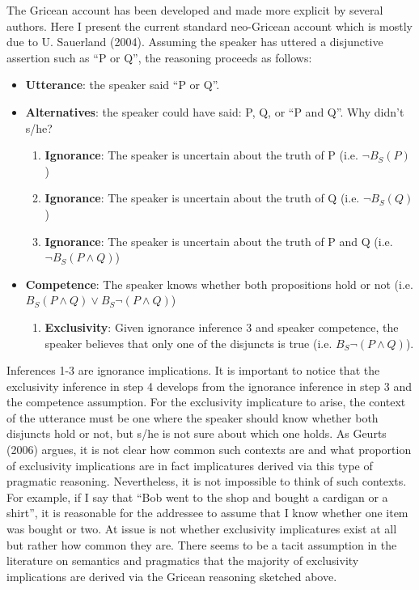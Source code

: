 \documentclass[oneside]{report}
\theoremstyle{definition}
\theoremstyle{definition}
\theoremstyle{definition}
\theoremstyle{remark}
\begin{document}
The Gricean account has been developed and made more explicit by several
authors. Here I present the current standard neo-Gricean account which
is mostly due to U. Sauerland (2004). Assuming the speaker has uttered a
disjunctive assertion such as ``P or Q'', the reasoning proceeds as
follows:
\begin{itemize}
\tightlist
\item
  \textbf{Utterance}: the speaker said ``P or Q''.
\item
  \textbf{Alternatives}: the speaker could have said: P, Q, or ``P and
  Q''. Why didn't s/he?
  \begin{enumerate}
  \def\labelenumi{\arabic{enumi}.}
  \tightlist
  \item
    \textbf{Ignorance}: The speaker is uncertain about the truth of P
    (i.e. \(\lnot B_S (P)\))
  \item
    \textbf{Ignorance}: The speaker is uncertain about the truth of Q
    (i.e. \(\lnot B_S (Q)\))
  \item
    \textbf{Ignorance}: The speaker is uncertain about the truth of P
    and Q (i.e. \(\lnot B_S (P \land Q)\))
  \end{enumerate}
\item
  \textbf{Competence}: The speaker knows whether both propositions hold
  or not (i.e. \(B_S (P \land Q) \lor B_S \lnot (P \land Q)\))
  \begin{enumerate}
  \def\labelenumi{\arabic{enumi}.}
  \setcounter{enumi}{3}
  \tightlist
  \item
    \textbf{Exclusivity}: Given ignorance inference 3 and speaker
    competence, the speaker believes that only one of the disjuncts is
    true (i.e. \(B_S \lnot (P \land Q)\)).
  \end{enumerate}
\end{itemize}
Inferences 1-3 are ignorance implications. It is important to notice
that the exclusivity inference in step 4 develops from the ignorance
inference in step 3 and the competence assumption. For the exclusivity
implicature to arise, the context of the utterance must be one where the
speaker should know whether both disjuncts hold or not, but s/he is not
sure about which one holds. As Geurts (2006) argues, it is not clear how
common such contexts are and what proportion of exclusivity implications
are in fact implicatures derived via this type of pragmatic reasoning.
Nevertheless, it is not impossible to think of such contexts. For
example, if I say that ``Bob went to the shop and bought a cardigan or a
shirt'', it is reasonable for the addressee to assume that I know
whether one item was bought or two. At issue is not whether exclusivity
implicatures exist at all but rather how common they are. There seems to
be a tacit assumption in the literature on semantics and pragmatics that
the majority of exclusivity implications are derived via the Gricean
reasoning sketched above.
\end{document}
